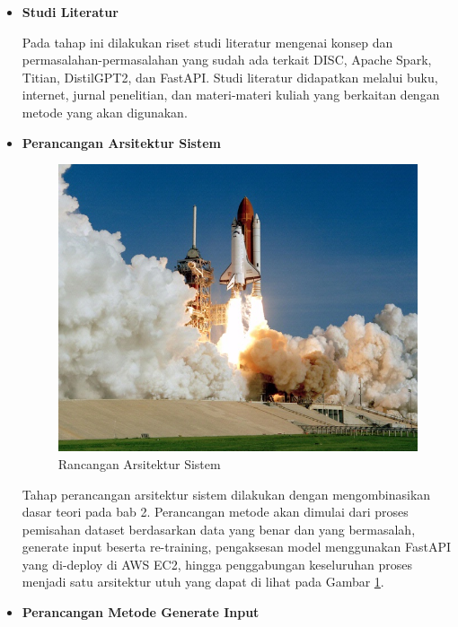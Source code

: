 \begin{itemize}[topsep=0pt]
  \item \textbf{Studi Literatur}
  
  Pada tahap ini dilakukan riset studi literatur mengenai konsep dan permasalahan-permasalahan yang sudah ada terkait DISC, Apache Spark, Titian, DistilGPT2, dan FastAPI. Studi literatur didapatkan melalui buku, internet, jurnal penelitian, dan materi-materi kuliah yang berkaitan dengan metode yang akan digunakan.

  \item \textbf{Perancangan Arsitektur Sistem}
  
  \begin{figure}[H]
    \centering
    \includegraphics[scale=0.35]{gambar/roketluarangkasa.jpg}
  
    \caption{Rancangan Arsitektur Sistem}
    \label{fig:arsitektur}
  \end{figure}
  
  Tahap perancangan arsitektur sistem dilakukan dengan mengombinasikan dasar teori pada bab 2. Perancangan metode akan dimulai dari proses pemisahan dataset berdasarkan data yang benar dan yang bermasalah, generate input beserta re-training, pengaksesan model menggunakan FastAPI yang di-deploy di AWS EC2, hingga penggabungan keseluruhan proses menjadi satu arsitektur utuh yang dapat di lihat pada Gambar \ref{fig:arsitektur}.

  \item \textbf{Perancangan Metode Generate Input}
  

\end{itemize}
